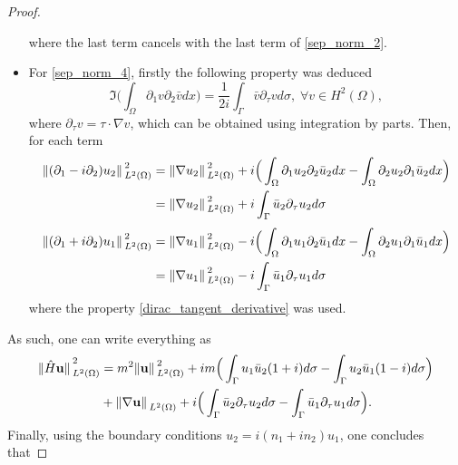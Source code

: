 \begin{proof}
\begin{itemize}
\[                \]
                where the last term cancels with the last term of \eqref{sep_norm_2}.
        \item For \eqref{sep_norm_4}, firstly the following property was deduced
                \begin{equation}\label{dirac_tangent_derivative}
                \Im \Big(\int_\Omega \partial_1 v \partial_2 \bar{v}dx\Big) = \frac{1}{2 i} \int_{\Gamma} \bar{v} \partial_\tau v d \sigma, \; \forall v \in H^2(\Omega),
                \end{equation}
                where \(\partial_\tau v= \tau \cdot \nabla v\), which can be obtained using integration by parts.
                Then, for each term
                \begin{align*}
                \norm*{(\partial_1 - i \partial_2)u_2}_{L^2(\Omega)}^2 &= \norm*{\nabla u_2}_{L^2(\Omega)}^2 + i \Big(\int_\Omega \partial_1 u_2 \partial_2 \bar{u}_2dx - \int_\Omega \partial_2 u_2 \partial_1 \bar{u}_2dx\Big)\\
                & = \norm*{\nabla u_2}_{L^2(\Omega)}^2 + i\int_{\Gamma} \bar{u}_2 \partial_\tau u_2 d \sigma
                \end{align*}
                \vspace*{-1cm}
                \begin{align*}
                \norm*{(\partial_1 + i \partial_2)u_1}_{L^2(\Omega)}^2 &= \norm*{\nabla u_1}_{L^2(\Omega)}^2 - i \Big(\int_\Omega \partial_1 u_1 \partial_2 \bar{u}_1dx - \int_\Omega \partial_2 u_1 \partial_1 \bar{u}_1dx\Big)\\
                & = \norm*{\nabla u_1}_{L^2(\Omega)}^2 - i\int_{\Gamma} \bar{u}_1 \partial_\tau u_1 d \sigma
                \end{align*}
                where the property \ref{dirac_tangent_derivative} was used.
    \end{itemize}
    As such, one can write everything as
    \begin{align*}
        \norm*{\hat{H}\mathbf{u}}_{L^2(\Omega)}^2 &= m^2 \norm*{\mathbf{u}}_{L^2(\Omega)}^2 + i m \Big(\int_{\Gamma} u_1\bar{u}_2(1+i)d\sigma - \int_{\Gamma} u_2\bar{u}_1(1-i)d\sigma \Big)\\
        & + \norm*{\nabla \mathbf{u}}_{L^2(\Omega)} + i\Big( \int_{\Gamma} \bar{u}_2 \partial_\tau u_2 d \sigma -  \int_{\Gamma} \bar{u}_1 \partial_\tau u_1 d \sigma \Big).
    \end{align*}
    Finally, using the boundary conditions \(u_2 = i(n_1 + i n_2)u_1\), one concludes that

\end{proof}
